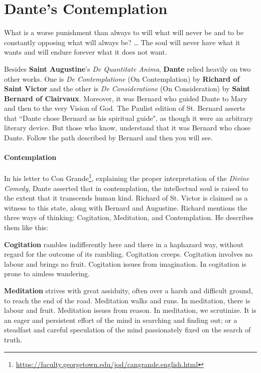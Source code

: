 \section{Dante's Contemplation}

\begin{quotex}
What is a worse punishment than always to will what will never be and to be constantly opposing what will always be? … The soul will never have what it wants and will endure forever what it does not want. 

\end{quotex}
Besides \textbf{Saint Augustine}'s \emph{De Quantitate Anima}, \textbf{Dante} relied heavily on two other works. One is \emph{De Contemplatione} (On Contemplation) by \textbf{Richard of Saint Victor} and the other is \emph{De Consideratione} (On Consideration) by \textbf{Saint Bernard of Clairvaux}. Moreover, it was Bernard who guided Dante to Mary and then to the very Vision of God. The Paulist edition of St. Bernard asserts that ``Dante chose Bernard as his spiritual guide", as though it were an arbitrary literary device. But those who know, understand that it was Bernard who chose Dante. Follow the path described by Bernard and then you will see.

\paragraph{Contemplation}
In his letter to Con Grande\footnote{\url{https://faculty.georgetown.edu/jod/cangrande.english.html}}, explaining the proper interpretation of the \emph{Divine Comedy}, Dante asserted that in contemplation, the intellectual soul is raised to the extent that it transcends human kind. Richard of St. Victor is claimed as a witness to this state, along with Bernard and Augustine. Richard mentions the three ways of thinking: Cogitation, Meditation, and Contemplation. He describes them like this:

\textbf{Cogitation} rambles indifferently here and there in a haphazard way, without regard for the outcome of its rambling. Cogitation creeps. Cogitation involves no labour and brings no fruit. Cogitation issues from imagination. In cogitation is prone to aimless wandering.

\textbf{Meditation} strives with great assiduity, often over a harsh and difficult ground, to reach the end of the road. Meditation walks and runs. In meditation, there is labour and fruit. Meditation issues from reason. In meditation, we scrutinize. It is an eager and persistent effort of the mind in searching and finding out; or a steadfast and careful speculation of the mind passionately fixed on the search of truth.

